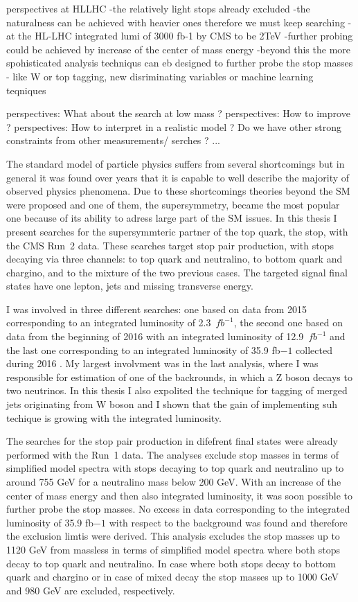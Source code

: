 perspectives at HLLHC
	-the relatively light stops already excluded
	-the naturalness can be achieved with heavier ones therefore we must keep searching
	-at the HL-LHC integrated lumi of 3000 fb-1 by CMS to be 2TeV
	-further probing could be achieved by increase of the center of mass energy
	-beyond this the more spohisticated analysis techniqus can eb designed to further probe the stop masses - like W or top tagging, new disriminating variables or machine learning teqniques

perspectives:	What about the search at low mass ?
perspectives:	How to improve ?
perspectives:	How to interpret in a realistic model ? Do we have other strong constraints from other measurements/ serches ? ...

The standard model of particle physics suffers from several shortcomings but in general it was found over years that it is capable to well describe the majority of observed physics phenomena. Due to these shortcomings theories beyond the SM were proposed and one of them, the supersymmetry, became the most popular one because of its ability to adress large part of the SM issues. In this thesis I present searches for the supersymmteric partner of the top quark, the stop, with the CMS Run~2 data. These searches target stop pair production, with stops decaying via three channels: to top quark and neutralino, to bottom quark and chargino, and to the mixture of the two previous cases.  The targeted signal final states have one lepton, jets and missing transverse energy. 

I was involved in three different searches: one based on data from 2015 corresponding to an integrated luminosity of 2.3~$fb^{-1}$, the second one based on data from the beginning of 2016 with an integrated luminosity of 12.9~$fb^{-1}$ and the last one corresponding to an integrated luminosity of 35.9 fb${-1}$ collected during 2016 . My largest involvment was in the last analysis, where I was responsible for estimation of one of the backrounds, in which a Z boson decays to two neutrinos. In this thesis I also expolited the technique for tagging of merged jets originating from W boson and I shown that the gain of implementing suh techique is growing with the integrated luminosity. 

The searches for the stop pair production in difefrent final states were already performed with the Run~1 data. The analyses exclude stop masses in terms of simplified model spectra with stops decaying to top quark and neutralino up to around 755 GeV for a neutralino mass below 200 GeV. With an increase of the center of mass energy and then also integrated luminosity, it was soon possible to further probe the stop masses. No excess in data corresponding to the integrated luminosity of 35.9 fb${-1}$ with respect to the background was found and therefore the exclusion limtis were derived. This analysis excludes the stop masses up to 1120 GeV from massless in terms of simplified model spectra where both stops decay to top quark and neutralino. In case where both stops decay to bottom quark and chargino or in case of mixed decay the stop masses up to 1000 GeV  and 980 GeV are excluded, respectively.


